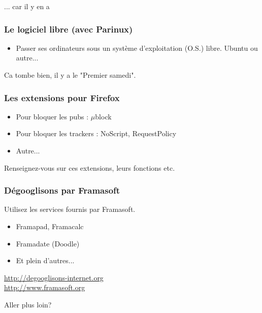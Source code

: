 \documentclass{beamer}
\begin{document}
\begin{frame}
\begin{center}
\Huge{... car il y en a}
\end{center}
\end{frame}

\begin{frame}
\frametitle{Le logiciel libre (avec Parinux)}
\begin{itemize}
\item Passer ses ordinateurs sous un système d'exploitation (O.S.) libre. Ubuntu ou autre...
\end{itemize}
Ca tombe bien, il y a le "Premier samedi".
\end{frame}

\begin{frame}
\frametitle{Les extensions pour Firefox}
\begin{itemize}
\item Pour bloquer les pubs : $\mu$block
\item Pour bloquer les trackers : NoScript, RequestPolicy
\item Autre...
\end{itemize}
Renseignez-vous sur ces extensions, leurs fonctions etc.
\end{frame}
\begin{frame}
\frametitle{Dégooglisons par Framasoft}
Utilisez les services fournis par Framasoft.
\begin{itemize}
\item Framapad, Framacalc
\item Framadate (Doodle)
\item Et plein d'autres...
\end{itemize}
\url{http://degooglisons-internet.org}
\\
\url{http://www.framasoft.org}
\end{frame}

\begin{frame}
\begin{center}
\Huge{Aller plus loin?}
\end{center}
\end{frame}
\end{document}
